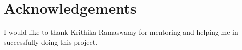 \chapter*{\centering Acknowledgements}
\quad  I would like to thank Krithika Ramaswamy for mentoring and helping me in successfully
doing this project. 

